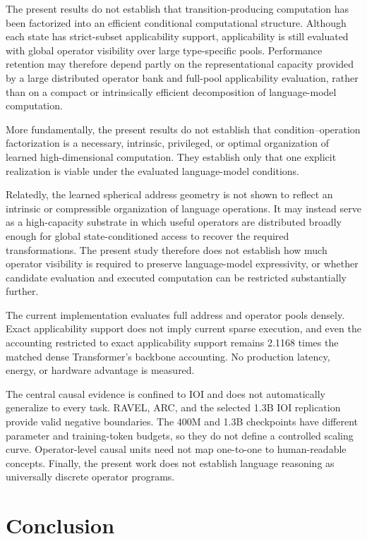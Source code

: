 \documentclass{article}
\begin{document}
The present results do not establish that transition-producing computation has
been factorized into an efficient conditional computational structure. Although
each state has strict-subset applicability support, applicability is still
evaluated with global operator visibility over large type-specific pools.
Performance retention may therefore depend partly on the representational
capacity provided by a large distributed operator bank and full-pool applicability
evaluation, rather than on a compact or intrinsically efficient decomposition
of language-model computation.

More fundamentally, the present results do not establish that
condition--operation factorization is a necessary, intrinsic, privileged, or
optimal organization of learned high-dimensional computation. They establish
only that one explicit realization is viable under the evaluated language-model
conditions.

Relatedly, the learned spherical address geometry is not shown to reflect an
intrinsic or compressible organization of language operations. It may instead
serve as a high-capacity substrate in which useful operators are distributed
broadly enough for global state-conditioned access to recover the required
transformations. The present study therefore does not establish how much
operator visibility is required to preserve language-model expressivity, or
whether candidate evaluation and executed computation can be restricted
substantially further.

The current implementation evaluates full address and operator pools densely.
Exact applicability support does not imply current sparse execution, and even
the accounting restricted to exact applicability support remains 2.1168 times
the matched dense Transformer's
backbone accounting. No production latency, energy, or hardware advantage is
measured.

The central causal evidence is confined to IOI and does not automatically
generalize to every task. RAVEL, ARC, and the selected 1.3B IOI replication
provide valid negative boundaries. The 400M and 1.3B checkpoints have
different parameter and training-token budgets, so they do not define a
controlled scaling curve. Operator-level causal units need not map one-to-one
to human-readable concepts. Finally, the present work does not establish language
reasoning as universally discrete operator programs.

\section{Conclusion}
\end{document}
